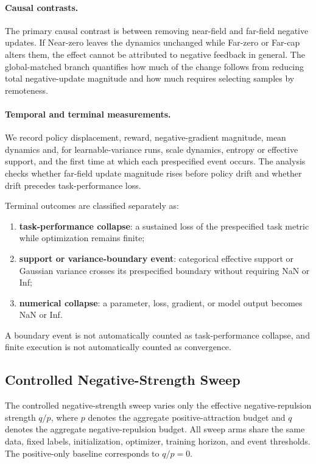 \documentclass{article}
\theoremstyle{plain}
\theoremstyle{definition}
\theoremstyle{remark}
\begin{document}
\paragraph{Causal contrasts.}
The primary causal contrast is between removing near-field and
far-field negative updates. If Near-zero leaves the dynamics unchanged
while Far-zero or Far-cap alters them, the effect cannot be attributed
to negative feedback in general. The global-matched branch quantifies
how much of the change follows from reducing total negative-update magnitude
and how much requires selecting samples by remoteness.

\paragraph{Temporal and terminal measurements.}
We record policy displacement, reward, negative-gradient magnitude,
mean dynamics and, for learnable-variance runs, scale dynamics, entropy or effective support, and the first
time at which each prespecified event occurs. The analysis checks whether
far-field update magnitude rises before policy drift and whether drift precedes
task-performance loss.

Terminal outcomes are classified separately as:

\begin{enumerate}
    \item \textbf{task-performance collapse}: a sustained loss of the
    prespecified task metric while optimization remains finite;
    \item \textbf{support or variance-boundary event}: categorical
    effective support or Gaussian variance crosses its prespecified
    boundary without requiring NaN or Inf;
    \item \textbf{numerical collapse}: a parameter, loss, gradient, or
    model output becomes NaN or Inf.
\end{enumerate}

A boundary event is not automatically counted as task-performance
collapse, and finite execution is not automatically counted as
convergence.

\subsection{Controlled Negative-Strength Sweep}
\label{app:negative_strength_sweep}

The controlled negative-strength sweep varies only the effective
negative-repulsion strength $q/p$, where $p$ denotes the aggregate
positive-attraction budget and $q$ denotes the aggregate
negative-repulsion budget. All sweep arms share the same data, fixed
labels, initialization, optimizer, training horizon, and event
thresholds. The positive-only baseline corresponds to $q/p=0$.
\end{document}
